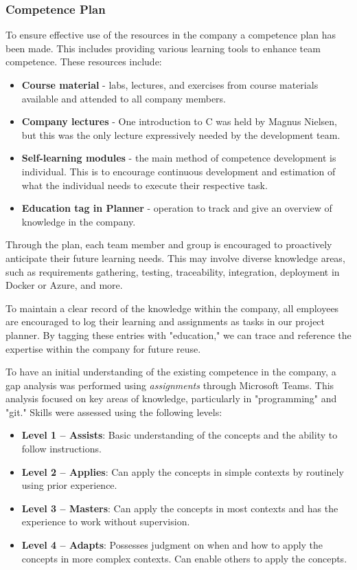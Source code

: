 \subsubsection{Competence Plan}
To ensure effective use of the resources in the company a competence plan has been made. This includes providing various learning tools to enhance team competence. These resources include:
\begin{itemize}
    \item \textbf{Course material} - labs, lectures, and exercises from course materials available and attended to all company members.
    \item \textbf{Company lectures} - One introduction to C was held by Magnus Nielsen, but this was the only lecture expressively needed by the development team.
    \item \textbf{Self-learning modules} - the main method of competence development is individual. This is to encourage continuous development and estimation of what the individual needs to execute their respective task.
    \item \textbf{Education tag in Planner} - operation to track and give an overview of knowledge in the company. 
\end{itemize}

Through the plan, each team member and group is encouraged to proactively anticipate their future learning needs. This may involve diverse knowledge areas, such as requirements gathering, testing, traceability, integration, deployment in Docker or Azure, and more.

To maintain a clear record of the knowledge within the company, all employees are encouraged to log their learning and assignments as tasks in our project planner. By tagging these entries with "education," we can trace and reference the expertise within the company for future reuse.

To have an initial understanding of the existing competence in the company, a gap analysis was performed using \textit{assignments} through Microsoft Teams. This analysis focused on key areas of knowledge, particularly in "programming" and "git." Skills were assessed using the following levels:

\begin{itemize}
    \item \textbf{Level 1 – Assists}: Basic understanding of the concepts and the ability to follow instructions.
    \item \textbf{Level 2 – Applies}: Can apply the concepts in simple contexts by routinely using prior experience.
    \item \textbf{Level 3 – Masters}: Can apply the concepts in most contexts and has the experience to work without supervision.
    \item \textbf{Level 4 – Adapts}: Possesses judgment on when and how to apply the concepts in more complex contexts. Can enable others to apply the concepts.
\end{itemize}

